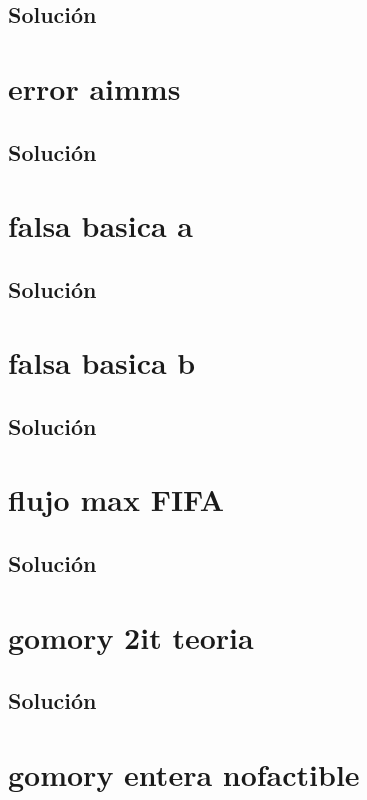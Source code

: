 \documentclass[a4paper,10pt,onecolumn]{report}
\begin{document}
\subsection*{Solución}

\clearpage
\section{error aimms}

\subsection*{Solución}

\clearpage
\section{falsa basica a}

\subsection*{Solución}

\clearpage
\section{falsa basica b}

\subsection*{Solución}

\clearpage
\section{flujo max FIFA}

\subsection*{Solución}

\clearpage
\section{gomory 2it teoria}

\subsection*{Solución}

\clearpage
\section{gomory entera nofactible}

\end{document}
